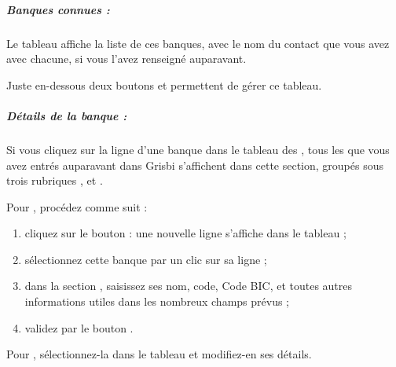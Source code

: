 \subparagraph{Banques connues :\label{setup-resources-banks-known}}


Le tableau affiche la liste de ces banques, avec le nom du contact que vous avez avec chacune, si vous l'avez renseigné auparavant. 


Juste en-dessous deux boutons  et  permettent de gérer ce tableau.

 


\subparagraph{Détails de la banque :\label{setup-resources-banks-details}}



Si vous cliquez sur la ligne d'une banque dans le tableau des , tous les  que vous avez entrés auparavant dans Grisbi s'affichent dans cette section, groupés sous trois rubriques ,  et .






Pour , procédez comme suit :

\begin{enumerate}
	\item cliquez sur le bouton  : une nouvelle ligne  s'affiche dans le tableau  ;
	\item sélectionnez cette banque par un clic sur sa ligne ;
	\item dans la section , saisissez ses nom, code, Code BIC, et toutes autres informations utiles dans les nombreux champs prévus ;
	\item validez par le bouton .
\end{enumerate}

\ifIllustration
\else
\fi

Pour , sélectionnez-la dans le tableau  et modifiez-en ses détails.

